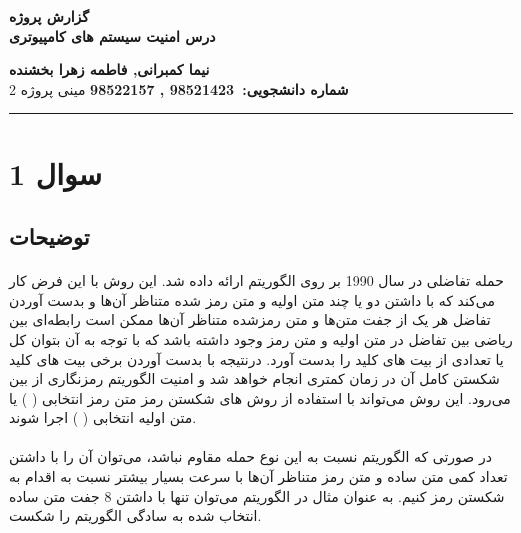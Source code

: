 
\def \Subject {گزارش پروژه}
\def \Course {درس امنیت سیستم های کامپیوتری}
\def \Author {نیما کمبرانی, فاطمه زهرا بخشنده}
\def \Report {مینی پروژه 2}
\def \StudentNumber {98521423 , 98522157}

\begin{center}
\vspace{.4cm}
{\bf {\huge \Subject}}\\
\vspace{.5cm}
{\bf \Large \Course}
\vspace{.2cm}
\end{center}
{\bf \Author }  \\
{\bf شماره دانشجویی:\ \StudentNumber}
\hspace{\fill} 
{\Large \Report} \\
\hrule
\vspace{0.8cm}

\clearpage

\par

\section{سوال 1}
\subsection{توضیحات}
\paragraph{}
حمله تفاضلی در سال 1990 بر روی الگوریتم 
ارائه داده شد. این روش با این فرض کار می‌کند که با داشتن دو یا چند متن اولیه و متن رمز شده متناظر آن‌ها و بدست آوردن تفاضل هر یک از جفت متن‌ها و متن رمزشده  متناظر آن‌ها ممکن است رابطه‌ای بین ریاضی بین تفاضل در متن اولیه و متن رمز وجود داشته باشد که با توجه به آن بتوان کل یا تعدادی از بیت های کلید را بدست آورد. درنتیجه با بدست آوردن برخی بیت های کلید شکستن کامل آن در زمان کمتری انجام خواهد شد و امنیت الگوریتم رمزنگاری از بین می‌رود. این روش می‌تواند با استفاده از روش های شکستن رمز  متن رمز انتخابی
(
) 
یا متن اولیه انتخابی 
(
)
اجرا شوند. 
\paragraph{}
در صورتی که الگوریتم نسبت به این نوع حمله  مقاوم نباشد، می‌توان آن را با داشتن تعداد کمی متن ساده و متن رمز متناظر آن‌ها با سرعت بسیار بیشتر نسبت به 
اقدام به شکستن رمز کنیم. به عنوان مثال در الگوریتم 
می‌توان تنها با داشتن 8 جفت متن ساده انتخاب شده به سادگی الگوریتم را شکست.

